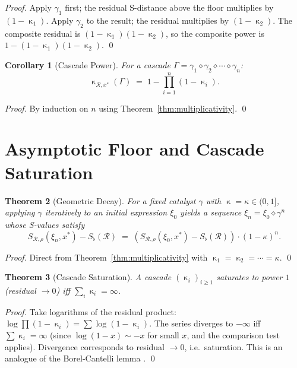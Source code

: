 \documentclass[twocolumn,a4paper]{article}
\newtheorem{theorem}{Theorem}[section]
\newtheorem{corollary}[theorem]{Corollary}
\DeclareMathOperator{\catpow}{\kappa}
\newcommand{\receiver}{\mathcal{R}}
\newcommand{\Sscalar}{S}
\newcommand{\Sfloor}{S_{\flat}}
\begin{document}
\begin{proof}
Apply $\gamma_{1}$ first; the residual S-distance above the floor multiplies by $(1-\catpow_{1})$. Apply $\gamma_{2}$ to the result; the residual multiplies by $(1-\catpow_{2})$. The composite residual is $(1-\catpow_{1})(1-\catpow_{2})$, so the composite power is $1-(1-\catpow_{1})(1-\catpow_{2})$. \qed
\end{proof}

\begin{corollary}[Cascade Power]
\label{cor:cascade-power}
For a cascade $\Gamma=\gamma_{1}\diamond\gamma_{2}\diamond\cdots\diamond\gamma_{n}$:
\[
\catpow_{\receiver,x^{*}}(\Gamma)\;=\;1-\prod_{i=1}^{n}(1-\catpow_{i}).
\]
\end{corollary}

\begin{proof}
By induction on $n$ using Theorem~\ref{thm:multiplicativity}. \qed
\end{proof}

\section{Asymptotic Floor and Cascade Saturation}
\label{sec:cascade-saturation}

\begin{theorem}[Geometric Decay]
\label{thm:geometric-decay}
For a fixed catalyst $\gamma$ with $\catpow=\kappa\in(0,1]$, applying $\gamma$ iteratively to an initial expression $\xi_{0}$ yields a sequence $\xi_{n}=\xi_{0}\diamond\gamma^{n}$ whose S-values satisfy
\[
\Sscalar_{\receiver,\rho}(\xi_{n},x^{*})-\Sfloor(\receiver)\;=\;(\Sscalar_{\receiver,\rho}(\xi_{0},x^{*})-\Sfloor(\receiver))\cdot(1-\kappa)^{n}.
\]
\end{theorem}

\begin{proof}
Direct from Theorem~\ref{thm:multiplicativity} with $\catpow_{1}=\catpow_{2}=\cdots=\kappa$. \qed
\end{proof}

\begin{theorem}[Cascade Saturation]
\label{thm:cascade-saturation}
A cascade $(\catpow_{i})_{i\geq 1}$ saturates to power $1$ (residual $\to 0$) iff $\sum_{i}\catpow_{i}=\infty$.
\end{theorem}

\begin{proof}
Take logarithms of the residual product: $\log\prod(1-\catpow_{i})=\sum\log(1-\catpow_{i})$. The series diverges to $-\infty$ iff $\sum\catpow_{i}=\infty$ (since $\log(1-x)\sim-x$ for small $x$, and the comparison test applies). Divergence corresponds to residual $\to 0$, i.e.\ saturation. This is an analogue of the Borel-Cantelli lemma \citep{borel1909probabilites,cantelli1917somma}. \qed
\end{proof}
\end{document}
